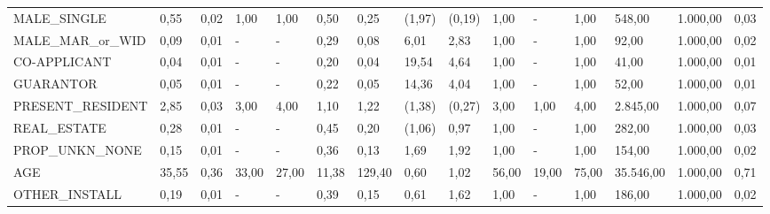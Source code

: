 \begin{table}[]
\begin{tabular}{|l|l|l|l|l|l|l|l|l|l|l|l|l|l|l|}
		{\tiny MALE\_SINGLE}& 0,55      & 0,02           & 1,00     & 1,00     & 0,50                                                           & 0,25               & (1,97)   & (0,19)   & 1,00        & -       & 1,00      & 548,00       & 1.000,00 & 0,03             \\
	{\tiny 	MALE\_MAR\_or\_WID}& 0,09      & 0,01           & -        & -        & 0,29                                                           & 0,08               & 6,01     & 2,83     & 1,00        & -       & 1,00      & 92,00        & 1.000,00 & 0,02             \\
		{\tiny CO-APPLICANT}& 0,04      & 0,01           & -        & -        & 0,20                                                           & 0,04               & 19,54    & 4,64     & 1,00        & -       & 1,00      & 41,00        & 1.000,00 & 0,01             \\
		{\tiny GUARANTOR}& 0,05      & 0,01           & -        & -        & 0,22                                                           & 0,05               & 14,36    & 4,04     & 1,00        & -       & 1,00      & 52,00        & 1.000,00 & 0,01             \\
		{\tiny PRESENT\_RESIDENT}& 2,85      & 0,03           & 3,00     & 4,00     & 1,10                                                           & 1,22               & (1,38)   & (0,27)   & 3,00        & 1,00    & 4,00      & 2.845,00     & 1.000,00 & 0,07             \\
		{\tiny REAL\_ESTATE}& 0,28      & 0,01           & -        & -        & 0,45                                                           & 0,20               & (1,06)   & 0,97     & 1,00        & -       & 1,00      & 282,00       & 1.000,00 & 0,03             \\
		{\tiny PROP\_UNKN\_NONE}& 0,15      & 0,01           & -        & -        & 0,36                                                           & 0,13               & 1,69     & 1,92     & 1,00        & -       & 1,00      & 154,00       & 1.000,00 & 0,02             \\
		{\tiny AGE}& 35,55     & 0,36           & 33,00    & 27,00    & 11,38                                                          & 129,40             & 0,60     & 1,02     & 56,00       & 19,00   & 75,00     & 35.546,00    & 1.000,00 & 0,71             \\
		{\tiny OTHER\_INSTALL}& 0,19      & 0,01           & -        & -        & 0,39                                                           & 0,15               & 0,61     & 1,62     & 1,00        & -       & 1,00      & 186,00       & 1.000,00 & 0,02             \\

\end{tabular}
\end{table}
